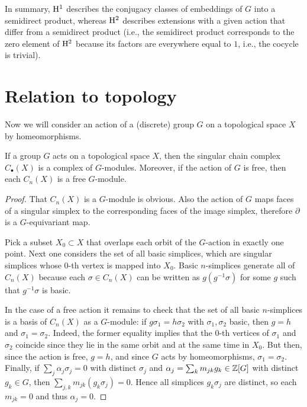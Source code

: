 In summary, $\mathrm{H}^1$ describes the conjugacy classes of embeddings of $G$ into a semidirect product, whereas $\mathrm{H}^2$ describes extensions with a given action that differ from a semidirect product (i.e., the semidirect product corresponds to the zero element of $\mathrm{H}^2$ because its factors are everywhere equal to $1$, i.e., the cocycle is trivial).

\section{Relation to topology}

Now we will consider an action of a (discrete) group $G$
 on a topological space $X$ by homeomorphisms.

\begin{prop}
    If a group $G$ acts on a topological space $X$, then the singular chain complex $C_\bullet(X)$ is a complex of $G$-modules. Moreover, if the action of $G$ is free, then each $C_n(X)$ is a free $G$-module.
\end{prop}
\begin{proof}
    That $C_n(X)$ is a $G$-module is obvious. Also the action of $G$ maps faces of a singular simplex to the corresponding faces of the image simplex, therefore $\partial$ is a $G$-equivariant map.

    Pick a subset $X_0\subset X$ that overlaps each orbit of the $G$-action in exactly one point. Next one considers the set of all basic simplices, which are singular simplices whose $0$-th vertex is mapped into $X_0$. Basic $n$-simplices generate all of $C_n(X)$ because each $\sigma\in C_n(X)$ can be written as $g(g^{-1}\sigma)$ for some $g$ such that $g^{-1}\sigma$ is basic. 
    
    In the case of a free action it remains to check that the set of all basic $n$-simplices is a basis of $C_n(X)$ as a $G$-module: if $g\sigma_1=h\sigma_2$ with $\sigma_1,\sigma_2$ basic, then $g=h$ and $\sigma_1=\sigma_2$. Indeed, the  former equality implies that the $0$-th vertices of $\sigma_1$ and $\sigma_2$ coincide since they lie in the same orbit and at the same time in $X_0$. But then, since the action is free, $g=h$, and since $G$ acts by homeomorphisms, $\sigma_1=\sigma_2$. Finally, if $\sum_j\alpha_j\sigma_j=0$ with distinct $\sigma_j$ and $\alpha_j=\sum_km_{jk}g_k\in \mathbb{Z}[G]$ with distinct $g_k\in G$, then $\sum_{j,k}m_{jk}(g_k \sigma_j)=0$. Hence all simplices $g_k\sigma_j$ are distinct, so each $m_{jk}=0$ and thus $\alpha_j=0$.
\end{proof}

